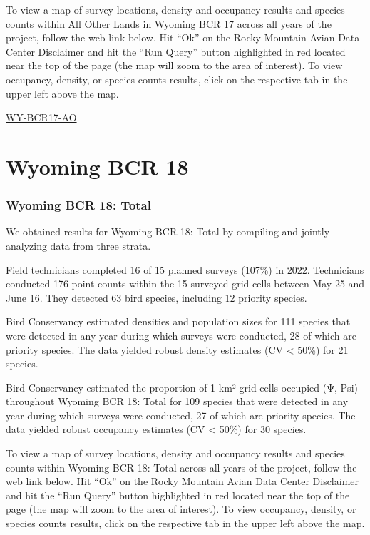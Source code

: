 \documentclass[
  letterpaper,
  DIV=11,
  numbers=noendperiod,
  oneside]{scrreprt}
\begin{document}
To view a map of survey locations, density and occupancy results and
species counts within All Other Lands in Wyoming BCR 17 across all years
of the project, follow the web link below. Hit ``Ok'' on the Rocky
Mountain Avian Data Center Disclaimer and hit the ``Run Query'' button
highlighted in red located near the top of the page (the map will zoom
to the area of interest). To view occupancy, density, or species counts
results, click on the respective tab in the upper left above the map.

\href{http://www.rmbo.org/new_site/adc/QueryWindow.aspx\#N4IgzgLgTghhCuBbEAuABCA6gTQLQCEBhAJQEYB2XAQQHl0qAbBtGiACwFMo0AZGAOwAmYEAF8gA}{WY-BCR17-AO}

\hypertarget{wyoming-bcr-18}{%
\section{Wyoming BCR 18}\label{wyoming-bcr-18}}

\hypertarget{wyoming-bcr-18-total}{%
\subsubsection{Wyoming BCR 18: Total}\label{wyoming-bcr-18-total}}

We obtained results for Wyoming BCR 18: Total by compiling and jointly
analyzing data from three strata.

Field technicians completed 16 of 15 planned surveys (107\%) in 2022.
Technicians conducted 176 point counts within the 15 surveyed grid cells
between May 25 and June 16. They detected 63 bird species, including 12
priority species.

Bird Conservancy estimated densities and population sizes for 111
species that were detected in any year during which surveys were
conducted, 28 of which are priority species. The data yielded robust
density estimates (CV \textless{} 50\%) for 21 species.

Bird Conservancy estimated the proportion of 1 km² grid cells occupied
(Ψ, Psi) throughout Wyoming BCR 18: Total for 109 species that were
detected in any year during which surveys were conducted, 27 of which
are priority species. The data yielded robust occupancy estimates (CV
\textless{} 50\%) for 30 species.

To view a map of survey locations, density and occupancy results and
species counts within Wyoming BCR 18: Total across all years of the
project, follow the web link below. Hit ``Ok'' on the Rocky Mountain
Avian Data Center Disclaimer and hit the ``Run Query'' button
highlighted in red located near the top of the page (the map will zoom
to the area of interest). To view occupancy, density, or species counts
results, click on the respective tab in the upper left above the map.
\end{document}
